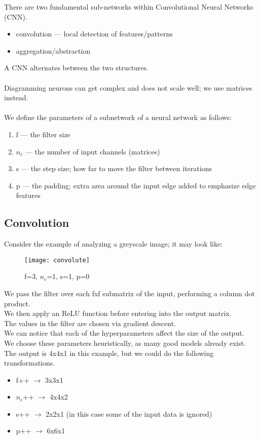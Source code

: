 \documentclass[../../lecture_notes.tex]{subfiles}
\begin{document}
\noindent There are two fundamental sub-networks within Convolutional Neural Networks (CNN).
\begin{itemize} [itemsep=0mm]
	\item convolution — local detection of features/patterns
	\item aggregation/abstraction
\end{itemize}
\noindent A CNN alternates between the two structures.\\
\\
Diagramming neurons can get complex and does not scale well; we use matrices instead.\\
\\
We define the parameters of a subnetwork of a neural network as follows:
\begin{enumerate} [itemsep=0mm]
	\item f — the filter size 
	\item $n_c$ — the number of input channels (matrices)
	\item s — the step size; how far to move the filter between iterations
	\item p — the padding; extra area around the input edge added to emphasize edge features
\end{enumerate}

\subsection*{Convolution}
\noindent Consider the example of analyzing a greyscale image; it may look like:

\begin{center}\begin{figure}[H]
	\texttt{[image: convolute]}
	\caption{f=3, $n_c$=1, s=1, p=0}
\end{figure}\end{center}

\noindent We pass the filter over each fxf submatrix of the input, performing a column dot product.\\
We then apply an ReLU function before entering into the output matrix.\\
The values in the filter are chosen via gradient descent.\\
We can notice that each of the hyperparameters affect the size of the output.\\
We choose these parameters heuristically, as many good models already exist.\\
The output is 4x4x1 in this example, but we could do the following transformations.
\begin{itemize} [itemsep=0mm]
	\item f++ $\to$ 3x3x1
	\item $n_c$++ $\to$ 4x4x2
	\item s++ $\to$ 2x2x1 (in this case some of the input data is ignored)
	\item p++ $\to$ 6x6x1
\end{itemize}\medskip
\end{document}

